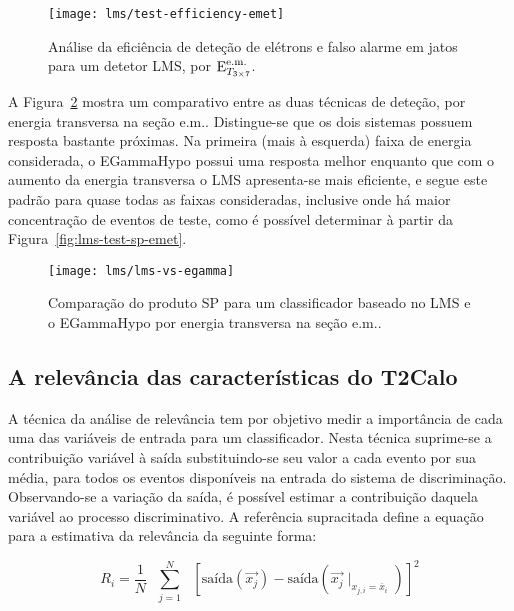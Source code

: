\begin{figure}
\begin{center}
\texttt{[image: lms/test-efficiency-emet]}
\end{center}
\caption{Análise da eficiência de deteção de elétrons e falso alarme em jatos
para um detetor LMS, por $\text{E}^{\text{e.m.}}_{T_{3\times7}}$.}
\label{fig:lms-test-efficiency-emet}
\end{figure}

A Figura~\ref{fig:lms-vs-egamma} mostra um comparativo entre as duas técnicas
de deteção, por energia transversa na seção e.m.. Distingue-se que os dois
sistemas possuem resposta bastante próximas. Na primeira (mais à esquerda)
faixa de energia considerada, o EGammaHypo possui uma resposta melhor enquanto
que com o aumento da energia transversa o LMS apresenta-se mais eficiente, e
segue este padrão para quase todas as faixas consideradas, inclusive onde há
maior concentração de eventos de teste, como é possível determinar à partir da
Figura~\ref{fig:lms-test-sp-emet}.

\begin{figure}
\begin{center}
\texttt{[image: lms/lms-vs-egamma]}
\end{center}
\caption{Comparação do produto SP para um classificador baseado no LMS e o
EGammaHypo por energia transversa na seção e.m..}
\label{fig:lms-vs-egamma}
\end{figure}

\subsection{A relevância das características do T2Calo}

A técnica da análise de relevância \cite{relevance} tem por objetivo medir a
importância de cada uma das variáveis de entrada para um classificador. Nesta
técnica suprime-se a contribuição variável à saída substituindo-se seu valor a
cada evento por sua média, para todos os eventos disponíveis na entrada do
sistema de discriminação. Observando-se a variação da saída, é possível
estimar a contribuição daquela variável ao processo discriminativo. A
referência supracitada define a equação para a estimativa da relevância da
seguinte forma:

\begin{equation}
R_i = \frac{1}{N} \text{ } \overset{N}{\underset{j=1}{\sum}} \text{ }
[\text{saída}(\overrightarrow{x_j}) -
\text{saída}(\overrightarrow{x_j}\mid_{x_{j,i} = \overline{x}_i})]^2 
\label{eq:relevance-mse}
\end{equation}

